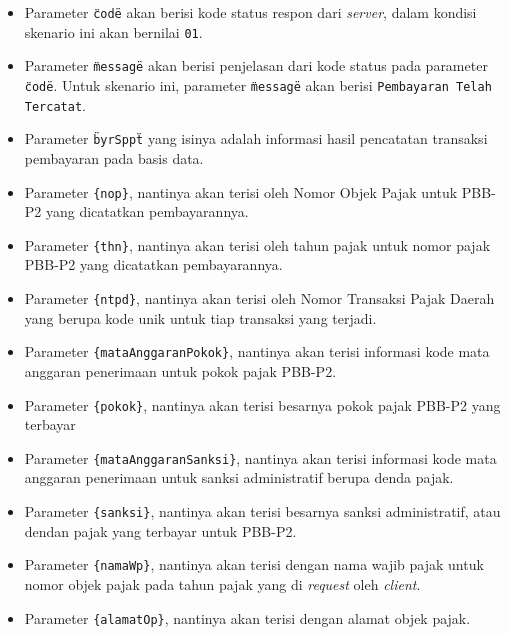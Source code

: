 \documentclass[pdftex,12pt, oneside]{article}
\begin{document}
  \begin{itemize}
    \item Parameter \texttt{\"code\"} akan berisi kode status respon dari \textit{server}, dalam kondisi skenario ini akan bernilai \texttt{01}.
    
    \item Parameter \texttt{\"message\"} akan berisi penjelasan dari kode status pada parameter \texttt{\"code\"}. Untuk skenario ini, parameter \texttt{\"message\"} akan berisi \texttt{Pembayaran Telah Tercatat}.
    
    \item Parameter \texttt{\"byrSppt\"} yang isinya adalah informasi hasil pencatatan transaksi pembayaran pada basis data.
    
    \item Parameter \texttt{\{nop\}}, nantinya akan terisi oleh Nomor Objek Pajak untuk PBB-P2 yang dicatatkan pembayarannya.
    
    \item Parameter \texttt{\{thn\}}, nantinya akan terisi oleh tahun pajak untuk nomor pajak PBB-P2 yang dicatatkan pembayarannya.
    
    \item Parameter \texttt{\{ntpd\}}, nantinya akan terisi oleh Nomor Transaksi Pajak Daerah yang berupa kode unik untuk tiap transaksi yang terjadi.
    
    \item Parameter \texttt{\{mataAnggaranPokok\}}, nantinya akan terisi informasi kode mata anggaran penerimaan untuk pokok pajak PBB-P2.
    
    \item Parameter \texttt{\{pokok\}}, nantinya akan terisi besarnya pokok pajak PBB-P2 yang terbayar
    
    \item Parameter \texttt{\{mataAnggaranSanksi\}}, nantinya akan terisi informasi kode mata anggaran penerimaan untuk sanksi administratif berupa denda pajak.
    
    \item Parameter \texttt{\{sanksi\}}, nantinya akan terisi besarnya sanksi administratif, atau dendan pajak yang terbayar untuk PBB-P2.
    
    \item Parameter \texttt{\{namaWp\}}, nantinya akan terisi dengan nama wajib pajak untuk nomor objek pajak pada tahun pajak yang di \textit{request} oleh \textit{client}.
    
    \item Parameter \texttt{\{alamatOp\}}, nantinya akan terisi dengan alamat objek pajak.
  \end{itemize}
  
\end{document}
